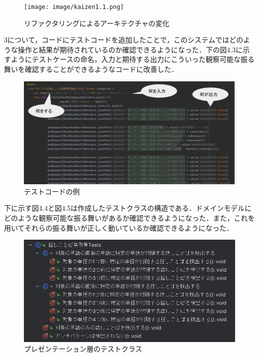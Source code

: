 \documentclass[12pt, a4paper]{jreport}
\begin{document}
\begin{figure}[H]
\centering
\texttt{[image: image/kaizen1.1.png]}
\caption{リファクタリングによるアーキテクチャの変化}
\label{fig:enter-label}
\end{figure}
3について，コードにテストコードを追加したことで，このシステムではどのような操作と結果が期待されているのか確認できるようになった．下の図4.3に示すようにテストケースの命名，入力と期待する出力にこういった観察可能な振る舞いを確認することができるようなコードに改善した．
\begin{figure}[H]
\centering
\includegraphics[width=1\linewidth]{image/kaizen3.png}
\caption{テストコードの例}
\label{fig:enter-label}
\end{figure}
下に示す図4.4と図4.5は作成したテストクラスの構造である．ドメインモデルにどのような観察可能な振る舞いがあるか確認できるようになった．また，これを用いてそれらの振る舞いが正しく動いているか確認できるようになった．
\begin{figure}[H]
\centering
\includegraphics[width=1\linewidth]{image/presenTest.png}
\caption{プレゼンテーション層のテストクラス}
\label{fig:enter-label}
\end{figure}
\end{document}
